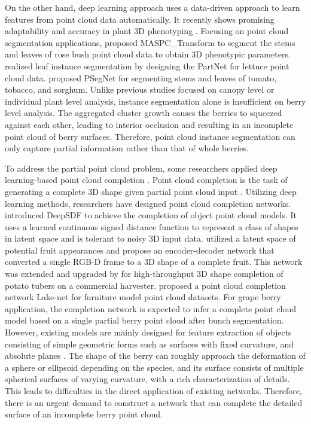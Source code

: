 \documentclass[12pt]{article}
\begin{document}
On the other hand, deep learning approach uses a data-driven approach to learn features from point cloud data automatically. 
It recently shows promising adaptability and accuracy in plant 3D phenotyping \citep{schneider_predicting_2020,scholer_automated_2015,rostami_survey_2019,du_pst_2023}. Focusing on point cloud segmentation applications, 
\citet{li_maspc_2022} proposed MASPC\_Transform to segment the stems and leaves of rose bush point cloud data to obtain 3D phenotypic parameters. 
\citet{wang_3d_2022} realized leaf instance segmentation by designing the PartNet for lettuce point cloud data. 
\citet{li_psegnet_2022} proposed PSegNet for segmenting stems and leaves of tomato, tobacco, and sorghum. 
Unlike previous studies focused on canopy level or individual plant level analysis, instance segmentation alone is insufficient on berry level analysis. 
The aggregated cluster growth \citep{du_instance_2023} causes the berries to squeezed against each other, leading to interior occlusion and resulting in an incomplete point cloud of berry surfaces. 
Therefore, point cloud instance segmentation can only capture partial information rather than that of whole berries.

To address the partial point cloud problem, some researchers applied deep learning-based point cloud completion \citep{wang_unsupervised_2021}. 
Point cloud completion is the task of generating a complete 3D shape given partial point cloud input \citep{tesema_point_2024}. 
Utilizing deep learning methods, researchers have designed point cloud completion networks. 
\citet{park_deepsdf_2019} introduced DeepSDF to achieve the completion of object point cloud models. It uses a learned continuous signed distance function to represent a class of shapes in latent space and is tolerant to noisy 3D input data. 
\citet{magistri_contrastive_2022} utilized a latent space of potential fruit appearances and propose an encoder-decoder network that converted a single RGB-D frame to a 3D shape of a complete fruit. 
This network was extended and upgraded by \citet{blok_highthroughput_2025} for high-throughput 3D shape completion of potato tubers on a commercial harvester.
\citet{tang_lakenet_2022} proposed a point cloud completion network Lake-net for furniture model point cloud datasets. 
For grape berry application, the completion network is expected to infer a complete point cloud model based on a single partial berry point cloud after bunch segmentation. 
However, existing models are mainly designed for feature extraction of objects consisting of simple geometric forms such as surfaces with fixed curvature, and absolute planes \citep{fei_comprehensive_2022}. 
The shape of the berry can roughly approach the deformation of a sphere or ellipsoid depending on the species, and its surface consists of multiple spherical surfaces of varying curvature, with a rich characterization of details. 
This leads to difficulties in the direct application of existing networks. 
Therefore, there is an urgent demand to construct a network that can complete the detailed surface of an incomplete berry point cloud.
\end{document}
